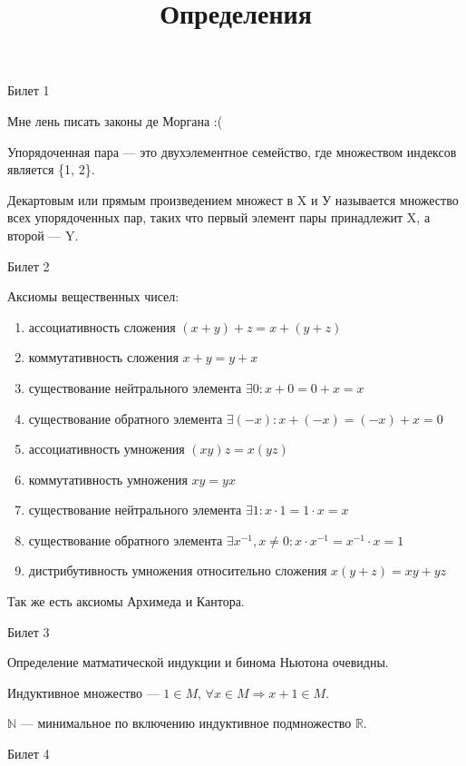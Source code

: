 \documentclass[12pt,a4paper]{article}
\title{Определения}
\begin{document}
	

\begin{center}
Билет 1
\end{center}

Мне лень писать законы де Моргана :(

Упорядоченная пара --- это двухэлементное семейство, где множеством индексов является \{1, 2\}.

Декартовым или прямым произведением множест в X и У называется множество всех упорядоченных пар, таких что первый элемент пары принадлежит X, а второй --- Y.

\begin{center}
Билет 2
\end{center}

Аксиомы вещественных чисел:
\begin{enumerate}
\item ассоциативность сложения $(x+y)+z=x+(y+z)$
\item коммутативность сложения $x+y=y+x$
\item существование нейтрального элемента $\exists 0: x+0=0+x=x$
\item существование обратного элемента $\exists (-x): x+(-x)=(-x)+x=0$
\item ассоциативность умножения $(xy)z=x(yz)$
\item коммутативность умножения $xy=yx$
\item существование нейтрального элемента $\exists 1: x \cdot 1 = 1 \cdot x = x$
\item существование обратного элемента $\exists x^{-1}, x \ne 0: x \cdot x^{-1}= x^{-1} \cdot x = 1$
\item дистрибутивность умножения относительно сложения $x(y+z)=xy+yz$
\end{enumerate}

Так же есть аксиомы Архимеда и Кантора.

\begin{center}
Билет 3
\end{center}

Определение матматической индукции и бинома Ньютона очевидны.

Индуктивное множество --- $1 \in M$, $\forall x \in M \Rightarrow x+1 \in M$.

$\mathbb{N}$ --- минимальное по включению индуктивное подмножество $\mathbb{R}$. 

\begin{center}
Билет 4
\end{center}
\end{document}
